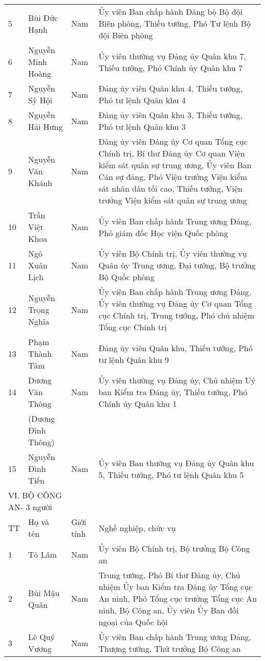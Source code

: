\begin{longtable}{p{}p{}p{}p{}}
5 &
  Bùi Đức Hạnh &
  Nam &
  Ủy viên Ban chấp hành Đảng bộ Bộ đội Biên phòng, Thiếu tướng, Phó Tư lệnh Bộ đội Biên phòng \\
6 &
  Nguyễn Minh Hoàng &
  Nam &
  Ủy viên thường vụ Đảng ủy Quân khu 7, Thiếu tướng, Phó Chính ủy Quân khu 7 \\
7 &
  Nguyễn Sỹ Hội &
  Nam &
  Đảng ủy viên Quân khu 4, Thiếu tướng, Phó tư lệnh Quân khu 4 \\
8 &
  Nguyễn Hải Hưng &
  Nam &
  Đảng ủy viên Quân khu 3, Thiếu tướng, Phó tư lệnh Quân khu 3 \\
9 &
  Nguyễn Văn Khánh &
  Nam &
  Đảng ủy viên Đảng ủy Cơ quan Tổng cục Chính trị, Bí thư Đảng ủy Cơ quan Viện kiểm sát quân sự trung ương, Ủy viên Ban Cán sự đảng, Phó Viện trưởng Viện kiểm sát nhân dân tối cao, Thiếu tướng, Viện trưởng Viện kiểm sát quân sự trung ương \\
10 &
  Trần Việt Khoa &
  Nam &
  Ủy viên Ban chấp hành Trung ương Đảng, Phó giám đốc Học viện Quốc phòng \\
11 &
  Ngô Xuân Lịch &
  Nam &
  Ủy viên Bộ Chính trị, Ủy viên thường vụ Quân ủy Trung ương, Đại tướng, Bộ trưởng Bộ Quốc phòng \\
12 &
  Nguyễn Trọng Nghĩa &
  Nam &
  Ủy viên Ban chấp hành Trung ương Đảng, Ủy viên thường vụ Đảng ủy Cơ quan Tổng cục Chính trị, Trung tướng, Phó chủ nhiệm Tổng cục Chính trị \\
13 &
  Phạm Thành Tâm &
  Nam &
  Đảng ủy viên Quân khu, Thiếu tướng, Phó tư lệnh Quân khu 9 \\
14 &
  Dương Văn Thông &
  Nam &
  Ủy viên thường vụ Đảng ủy, Chủ nhiệm Uỷ ban Kiểm tra Đảng ủy, Thiếu tướng, Phó Chính ủy Quân khu 1 \\
 &
  (Dương Đình Thông) &
 &
 \\
15 &
  Nguyễn Đình Tiến &
  Nam &
  Ủy viên Ban thường vụ Đảng ủy Quân khu 5, Thiếu tướng, Phó tư lệnh Quân khu 5 \\
\multicolumn{2}{l}{VI. BỘ CÔNG AN- 3 người} &
 &
 \\
TT &
  Họ và tên &
  Giới tính &
  Nghề nghiệp, chức vụ \\
1 &
  Tô Lâm &
  Nam &
  Ủy viên Bộ Chính trị, Bộ trưởng Bộ Công an \\
2 &
  Bùi Mậu Quân &
  Nam &
  Trung tướng, Phó Bí thư Đảng ủy, Chủ nhiệm Ủy ban Kiểm tra Đảng ủy Tổng cục An ninh, Phó Tổng cục trưởng Tổng cục An ninh, Bộ Công an, Ủy viên Ủy Ban đối ngoại của Quốc hội \\
3 &
  Lê Quý Vương &
  Nam &
  Ủy viên Ban chấp hành Trung ương Đảng, Thượng tướng, Thứ trưởng Bộ Công an \\

\end{longtable}

